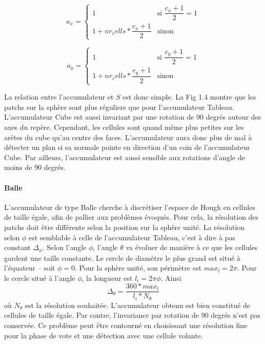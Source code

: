 \documentclass[12pt, twoside]{article}
\begin{document}
\begin{equation*}
  a_x = 
     \begin{cases}
        1 & \text{si $\dfrac{c_x + 1}{2} = 1$} \\
        1 + nr_cells*\dfrac{c_x + 1}{2} & \text{sinon}
     \end{cases}
\end{equation*}

\begin{equation*}
  a_y = 
     \begin{cases}
        1 & \text{si $\dfrac{c_y + 1}{2} = 1$} \\
        1 + nr_cells*\dfrac{c_y + 1}{2} & \text{sinon}
     \end{cases}
\end{equation*}

La relation entre l’accumulateur et $S$ est donc simple. La Fig 1.4 montre que les patchs sur la sphère sont plus réguliers que pour l’accumulateur Tableau. L’accumulateur Cube est aussi invariant par une rotation de 90 degrés autour des axes du repère. Cependant, les cellules sont quand même plus petites sur les arêtes du cube qu’au centre des faces. L’accumulateur aura donc plus de mal à détecter un plan si sa normale pointe en direction d’un coin de l’accumulateur Cube. Par ailleurs, l’accumulateur est aussi sensible aux rotations d’angle de moins de 90 degrés.

\paragraph{Balle}
L’accumulateur de type Balle cherche à discrétiser l’espace de Hough en cellules de taille égale, afin de pallier aux problèmes évoqués. Pour cela, la résolution des patchs doit être différente selon la position sur la sphère unité. La résolution selon $\phi$ est semblable à celle de l’accumulateur Tableau, c’est à dire à pas constant $\Delta_{\phi}$. Selon l’angle $\phi$, l’angle $\theta$ va évoluer de manière à ce que les cellules gardent une taille constante. Le cercle de diamètre le plus grand est situé à l’équateur -- soit $\phi = 0$. Pour la sphère unité, son périmètre est $max_l = 2\pi$. Pour le cercle situé à l’angle $\phi$, la longueur est $l_i = 2\pi \phi$. Ainsi
$$\Delta_{\theta} = \dfrac{360*max_l}{l_i*N_{\theta}}$$
où $N_{\theta}$ est la résolution souhaitée. L’accumulateur obtenu est bien constitué de cellules de taille égale. Par contre, l’invariance par rotation de 90 degrés n’est pas conservée. Ce problème peut être contourné en choisissant une résolution fine pour la phase de vote et une détection avec une cellule volante.
\end{document}
